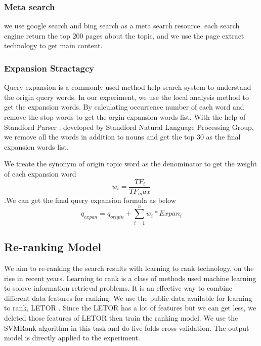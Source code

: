 \documentclass[runningheads,a4paper]{llncs}
\begin{document}
\subsubsection{Meta search}

we use google search and bing search as a meta search resource. each search engine return the top 200 pages about the topic, and we use the page extract technology \cite{2012-Lin-p256-264} to get main content.  

\subsubsection{Expansion Stractagcy}
Query expansion is a commonly used method help search system to understand the origin query words. In our experiment, we use the local analysis \cite{2010-Imran-p386-393} method to get the expansion words. By calculating occurrence number of each word and remove the stop words to get the orgin expansion words list. With the help of Standford Parser \cite{standfordparser} , developed by Standford Natural Language Processing Group, we remove all the words in addition to nouns and get the top 30 as the final expansion words list.

We treate the synonym of origin topic word as the denominator to get the weight of each expansion word
\begin{equation}
w_i = \frac{TF_i}{TF_max}
\end{equation}
.We can get the final query expansion formula as below
\begin{equation}
q_{expan} = q_{origin} + \sum_{i=1}^n w_i * Expan_i
\end{equation}
\subsection{Re-ranking Model}

We aim to re-ranking the search results with learning to rank technology, on the rise in recent years. Learning to rank is a class of methods used machine learning to solove information retrieval problems. It is an effective way to combine different data features for ranking. We use the public data available for learning to rank, LETOR \cite{2007-Liu-p3-10}. Since the LETOR has a lot of features but we can get less,  we deleted those features of LETOR then train the ranking model. We use the SVMRank \cite{2010-Chapelle-p201-215} algorithm in this task and do five-folds cross validation. The output model is directly applied to the experiment.
\end{document}
